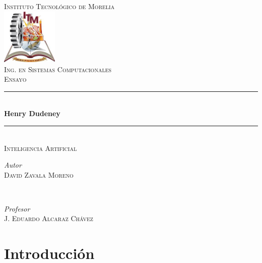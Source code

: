 \documentclass[12pt]{article}
\begin{document}
\begin{titlepage}
	\newcommand{\HRule}{\rule{\linewidth}{0.5mm}} 
	
	\center 
	
	
	
	\textsc{\LARGE Instituto Tecnológico de Morelia }\\[1.5cm] 
    
    \includegraphics[width=0.2\textwidth]{descarga.jpg}\\[1cm] 
	
	\textsc{\Large Ing. en Sistemas Computacionales}\\[0.5cm] 
	
	\textsc{\large Ensayo }\\[0.5cm] 
	
	
	
	\HRule\\[0.4cm]
	
	{\huge\bfseries Henry Dudeney}\\[0.4cm]
	
	\HRule\\[0.6cm]
	
	\textsc{\large Inteligencia Artificial }\\[0.5cm]
	
	\begin{minipage}{0.4\textwidth}
		\begin{flushleft}
			\large
			\textit{Autor}\\
		    \textsc{David Zavala Moreno} 
		\end{flushleft}
	\end{minipage}
	~
	\begin{minipage}{0.5\textwidth}
		\begin{flushright}
			\large
			\textit{Profesor}\\
			\textsc{J. Eduardo Alcaraz Chávez}
		\end{flushright}
	\end{minipage}
  
\end{titlepage}

\newpage
\newpage
\tableofcontents 
\newpage

\section{Introducción}
\end{document}
